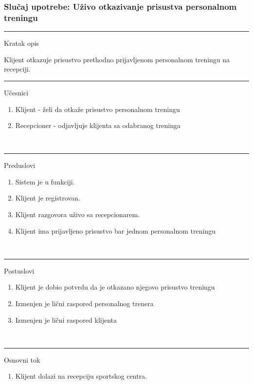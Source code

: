 \subsubsection{Slučaj upotrebe: Uživo otkazivanje prisustva personalnom treningu}


\begin{center}
\vspace{0.2cm}
\hrule
\vspace{0.2cm}
    \begin{center}
    Kratak opis
    \end{center}
    Klijent otkazuje prisustvo prethodno prijavljenom personalnom treningu na recepciji.
    \vspace{0.2cm}\\ 
\hrule   
\vspace{0.2cm}
    Učesnici 
    \begin{enumerate}
    \item Klijent - želi da otkaže prisustvo personalnom treningu
    \item Recepcioner - odjavljuje klijenta sa odabranog treninga
   \end{enumerate} \\
\hrule
\vspace{0.2cm}
   Preduslovi 
   \begin{enumerate}
    \item Sistem je u funkciji.
    \item Klijent je registrovan.
    \item Klijent razgovora uživo sa recepcionarem.
    \item Klijent ima prijavljeno prisustvo bar jednom personalnom treningu
   \end{enumerate}\\
\hrule  
\vspace{0.2cm}
    Postuslovi 
    \begin{enumerate}
    \item Klijent je dobio potvrdu da je otkazano njegovo prisustvo treningu
    \item Izmenjen je lični raspored personalnog trenera
    \item Izmenjen je lični raspored klijenta
   \end{enumerate}\\
\hrule
\vspace{0.2cm}
    Osnovni tok 
    \begin{enumerate}
    \item Klijent dolazi na recepciju sportskog centra.

\end{enumerate}
\end{center}
